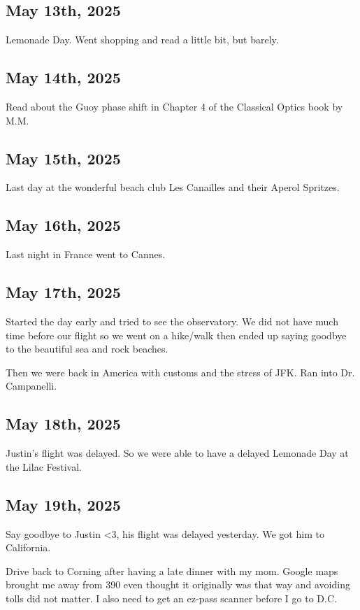 \documentclass{article}
\begin{document}
\subsection{May 13th, 2025}
Lemonade Day.
Went shopping and read a little bit, but barely. 
\subsection{May 14th, 2025}
Read about the Guoy phase shift in Chapter 4 of the Classical Optics book by M.M.


\subsection{May 15th, 2025}
Last day at the wonderful beach club Les Canailles and their Aperol Spritzes.  

\subsection{May 16th, 2025}
Last night in France went to Cannes. 

\subsection{May 17th, 2025}
Started the day early and tried to see the observatory. We did not have much time before our flight so we went on a hike/walk then ended up saying goodbye to the beautiful sea and rock beaches. 

Then we were back in America with customs and the stress of JFK. Ran into Dr. Campanelli. 

\subsection{May 18th, 2025}
Justin's flight was delayed. So we were able to have a delayed Lemonade Day at the Lilac Festival. 

\subsection{May 19th, 2025}
Say goodbye to Justin <3, his flight was delayed yesterday. We got him to California. 

Drive back to Corning after having a late dinner with my mom. Google maps brought me away from 390 even thought it originally was that way and avoiding tolls did not matter. I also need to get an ez-pass scanner before I go to D.C. 
\end{document}
